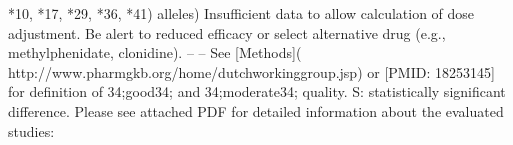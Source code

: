 *10, *17, *29, *36, *41) alleles) \markdownRendererPipe{} Insufficient data to allow calculation of dose adjustment. Be alert to reduced efficacy or select alternative drug (e.g., methylphenidate, clonidine). \markdownRendererPipe{} -- \markdownRendererPipe{} -- \markdownRendererPipe{}\markdownRendererInterblockSeparator
{}\markdownRendererUlBeginTight
\markdownRendererUlItem *See [Methods]( http://www.pharmgkb.org/home/dutchworking\markdownRendererUnderscore{}group.jsp) or [PMID: 18253145] for definition of \markdownRendererAmpersand{}\markdownRendererHash{}34;good\markdownRendererAmpersand{}\markdownRendererHash{}34; and \markdownRendererAmpersand{}\markdownRendererHash{}34;moderate\markdownRendererAmpersand{}\markdownRendererHash{}34; quality.\markdownRendererUlItemEnd 
\markdownRendererUlItem S: statistically significant difference.\markdownRendererUlItemEnd 
\markdownRendererUlItem Please see attached PDF for detailed information about the evaluated studies: \markdownRendererUlItemEnd 
\markdownRendererUlEndTight \relax